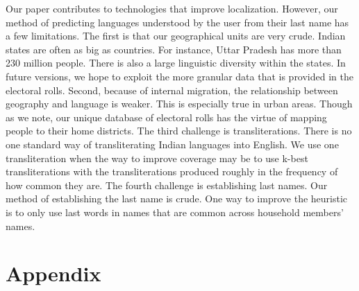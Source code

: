 \documentclass[11pt,  letterpaper]{article}
\begin{document}
Our paper contributes to technologies that improve localization. However, our method of predicting languages understood by the user from their last name has a few limitations. The first is that our geographical units are very crude. Indian states are often as big as countries. For instance, Uttar Pradesh has more than 230 million people. There is also a large linguistic diversity within the states. In future versions, we hope to exploit the more granular data that is provided in the electoral rolls. Second, because of internal migration, the relationship between geography and language is weaker. This is especially true in urban areas. Though as we note, our unique database of electoral rolls has the virtue of mapping people to their home districts. The third challenge is transliterations. There is no one standard way of transliterating Indian languages into English. We use one transliteration when the way to improve coverage may be to use k-best transliterations with the transliterations produced roughly in the frequency of how common they are. The fourth challenge is establishing last names. Our method of establishing the last name is crude. One way to improve the heuristic is to only use last words in names that are common across household members’ names. 


\section{Appendix}

\newpage


\end{document}
